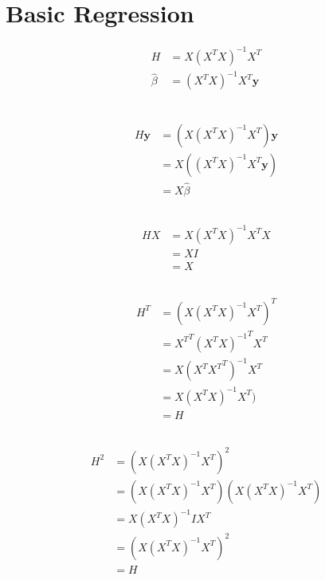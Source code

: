 \documentclass[12pt,a4paper]{article}
\begin{document}
\section{Basic Regression}
\begin{align}
H &= X(X^T X)^{-1}X^T\\
\hat{\beta} &= (X^T X)^{-1}X^T\mathbf{y}\\
\end{align}

\subsection{}
\begin{align*}
H\textbf{y}&= (X(X^T X)^{-1}X^T)\textbf{y}\\
&=X((X^T X)^{-1}X^T\textbf{y})\\
 &= X\hat{\beta}
\end{align*}

\subsection{}
\begin{align*}
HX&= X(X^T X)^{-1}X^TX\\
&= XI\\
&=X
\end{align*}

\subsection{}
\begin{align*}
H^T&= (X(X^T X)^{-1}X^T)^T\\
&= {X^T}^T{(X^T X)^{-1}}^TX^T\\
&= X(X^T {X^T}^T)^{-1}X^T\\
&= X(X^T X)^{-1}X^T)\\
&= H
\end{align*}

\subsection{}
\begin{align*}
H^2&= (X(X^T X)^{-1}X^T)^2\\
&= (X(X^T X)^{-1}X^T)(X(X^T X)^{-1}X^T) \\
&= X(X^T X)^{-1}IX^T \\
&= (X(X^T X)^{-1}X^T)^2\\
&= H
\end{align*}
\subsection{}
\end{document}

